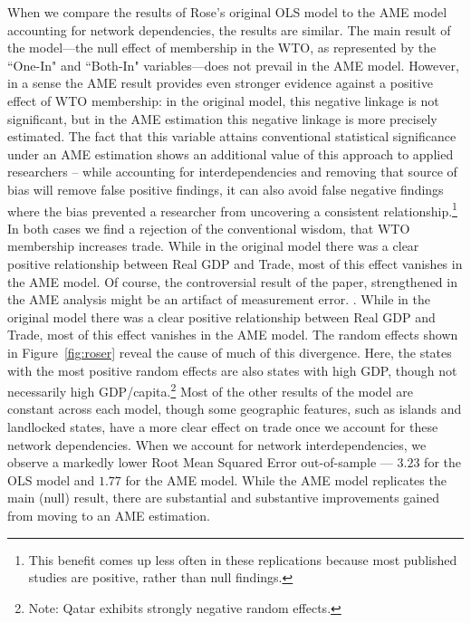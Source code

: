 \documentclass{article}[12pt]
\begin{document}
When we compare the results of Rose's original OLS model to the AME model accounting for network dependencies, the results are similar. The main result of the model---the null effect of membership in the WTO, as represented by the ``One-In" and ``Both-In" variables---does not prevail in the AME model. However, in a sense the AME result provides even stronger evidence against a positive effect of WTO membership: in the original model, this negative linkage is not significant, but in the AME estimation this negative linkage is more precisely estimated. The fact that this variable attains conventional statistical significance under an AME estimation shows an additional value of this approach to applied researchers -- while accounting for interdependencies and removing that source of bias will remove false positive findings, it can also avoid false negative findings where the bias prevented a researcher from uncovering a consistent relationship.\footnote{This benefit comes up less often in these replications because most published studies are positive, rather than null findings.} In both cases we find  a rejection of the conventional wisdom, that WTO membership increases trade. While in the original model there was a clear positive relationship between Real GDP and Trade, most of this effect vanishes in the AME model. Of course, the controversial result of the paper, strengthened in the AME analysis might be an artifact of measurement error. \citep{tomz:etal:2007}. While in the original model there was a clear positive relationship between Real GDP and Trade, most of this effect vanishes in the AME model. The random effects shown in Figure~\ref{fig:roser} reveal the cause of much of this divergence. Here, the states with the most positive random effects are also states with high GDP, though not necessarily high GDP/capita.\footnote{Note: Qatar exhibits strongly negative random effects.}  Most of the other results of the model are constant across each model, though some geographic features, such as islands and landlocked states, have a more clear effect on trade once we account for these network dependencies. When we account for network interdependencies, we observe a markedly lower Root Mean Squared Error out-of-sample --- $3.23$ for the OLS model and $1.77$ for the AME model. While the AME model replicates the main (null) result, there are substantial and substantive improvements gained from moving to an AME estimation.
\end{document}
